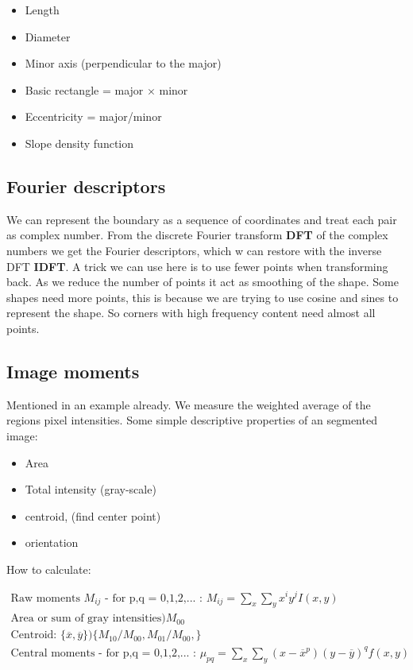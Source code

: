 \begin{itemize}
	\item Length
	\item Diameter
	\item Minor axis (perpendicular to the major)
	\item Basic rectangle = major $\times$ minor
	\item Eccentricity = major/minor
	\item Slope density function
\end{itemize}


\subsection*{Fourier descriptors}
We can represent the boundary as a sequence of coordinates and treat each pair as complex number. From the discrete Fourier transform \textbf{DFT} of the complex numbers we get the Fourier descriptors, which w can restore with the inverse DFT \textbf{IDFT}. A trick we can use here is to use fewer points when transforming back. As we reduce the number of points it act as smoothing of the shape. Some shapes need more points, this is because we are trying to use cosine and sines to represent the shape. So corners with high frequency content need almost all points.

\subsection*{Image moments}
Mentioned in an example already. We measure the weighted average of the regions pixel intensities. Some simple descriptive properties of an segmented image:

\begin{itemize}
	\item Area
	\item Total intensity (gray-scale)
	\item centroid, (find center point)
	\item orientation
\end{itemize}

How to calculate:

\begin{equation}
\begin{aligned}
\text{Raw moments $M_{ij}$ - for p,q  = 0,1,2,... : } M_{ij} = \sum_{x}^{} \sum_{y}^{} x^iy^jI(x,y) \\
\text{Area or sum of gray intensities} ) M_{00} \\
\text{Centroid: } \{\overline{x},\overline{y} \} ) \{ M_{10}/M_{00},M_{01}/M_{00}, \} \\
\text{Central moments - for p,q = 0,1,2,... : } \mu_{pq} = \sum_{x}^{} \sum_{y}^{}(x- \overline{x}^p) (y-\overline{y})^qf(x,y)
\end{aligned}
\end{equation}

